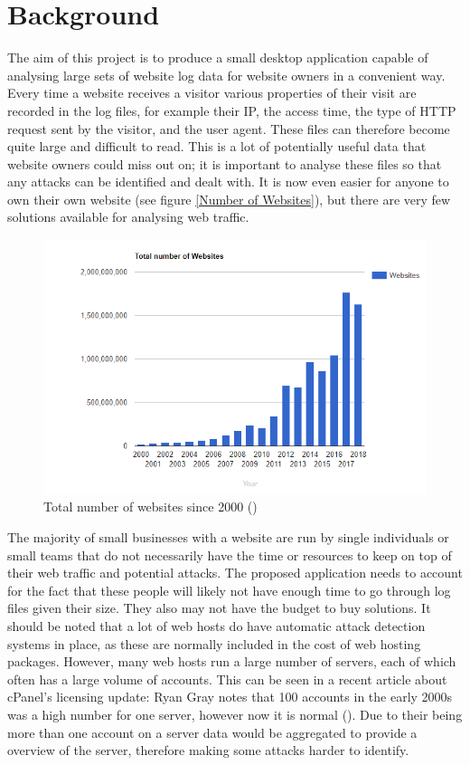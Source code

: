 \section{Background}
The aim of this project is to produce a small desktop application capable of analysing large sets of website log data for website owners in a convenient way. Every time a website receives a visitor various properties of their visit are recorded in the log files, for example their IP, the access time, the type of HTTP request sent by the visitor, and the user agent. These files can therefore become quite large and difficult to read. This is a lot of potentially useful data that website owners could miss out on; it is important to analyse these files so that any attacks can be identified and dealt with. It is now even easier for anyone to own their own website (see figure \ref{Number of Websites}), but there are very few solutions available for analysing web traffic.

\begin{figure}[H] \label{Number of Websites} 
    \centering
    \includegraphics[width=\textwidth]{Images/numberOfWebsites.png}
    \caption{Total number of websites since 2000 (\cite{NumberofWebsites})}
    \label{Total number of websites since 2000}
\end{figure}
The majority of small businesses with a website are run by single individuals or small teams that do not necessarily have the time or resources to keep on top of their web traffic and potential attacks. The proposed application needs to account for the fact that these people will likely not have enough time to go through log files given their size. They also may not have the budget to buy solutions. It should be noted that a lot of web hosts do have automatic attack detection systems in place, as these are normally included in the cost of web hosting packages. However, many web hosts run a large number of servers, each of which often has a large volume of accounts. This can be seen in a recent article about cPanel's licensing update: Ryan Gray notes that 100 accounts in the early 2000s was a high number for one server, however now it is normal (\cite{cPanelArticle}). Due to their being more than one account on a server data would be aggregated to provide a overview of the server, therefore making some attacks harder to identify.


